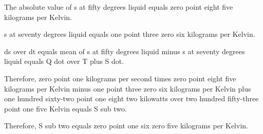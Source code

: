 The absolute value of s at fifty degrees liquid equals zero point eight five kilograms per Kelvin.

s at seventy degrees liquid equals one point three zero six kilograms per Kelvin.

ds over dt equals mean of s at fifty degrees liquid minus s at seventy degrees liquid equals Q dot over T plus S dot.

Therefore, zero point one kilograms per second times zero point eight five kilograms per Kelvin minus one point three zero six kilograms per Kelvin plus one hundred sixty-two point one eight two kilowatts over two hundred fifty-three point one five Kelvin equals S sub two.

Therefore, S sub two equals zero point one six zero five kilograms per Kelvin.